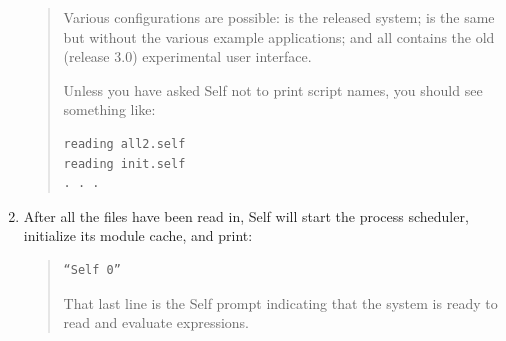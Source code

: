 \documentclass[letterpaper,10pt,english]{sphinxmanual}
\begin{document}
\begin{enumerate}
\begin{quote}
Various configurations are possible:  is the released system;  is the same but
without the various example applications; and all contains the old (release 3.0) experimental
user interface.

Unless you have asked Self not to print script names, you should see something like:

\begin{Verbatim}[commandchars=\\\{\}]
reading all2.self
reading init.self
. . .
\end{Verbatim}
\end{quote}

\item {} 
After all the files have been read in, Self will start the process scheduler, initialize its module cache, and print:
\begin{quote}

\begin{Verbatim}[commandchars=\\\{\}]
“Self 0”
\end{Verbatim}

That last line is the Self prompt indicating that the system is ready to read and evaluate expressions.
\end{quote}

\end{enumerate}
\end{document}
